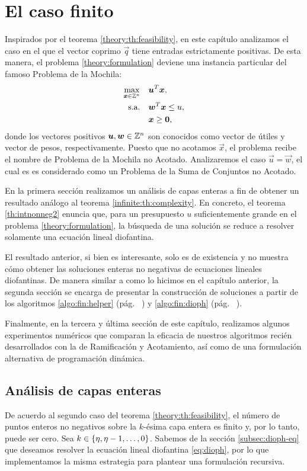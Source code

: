 \chapter{El caso finito}
\noindent
Inspirados por el teorema \ref{theory:th:feasibility}, en este capítulo analizamos el
caso en el que el vector coprimo $\vec{q}$ tiene entradas estrictamente positivas. De esta manera,
el problema \eqref{theory:formulation} deviene una instancia particular del famoso Problema de la
Mochila:
\begin{subequations}
	\label{knapsack-formulation}
	\begin{align}
		\max_{\boldsymbol{x} \in \mathbb{Z}^n} \quad
			& \boldsymbol{u}^T\boldsymbol{x}, \\
		\text{s.a.} \quad
			& \boldsymbol{w}^T\boldsymbol{x} \leq u, \\
			& \boldsymbol{x} \geq \boldsymbol{0},
	\end{align}
\end{subequations}
donde los vectores positivos $\boldsymbol{u}, \boldsymbol{w} \in \mathbb{Z}^n$ son conocidos como
vector de útiles y vector de pesos, respectivamente. Puesto que no acotamos
$\vec{x}$, el problema recibe el nombre de Problema de la Mochila no Acotado.
Analizaremos el caso $\vec{u} = \vec{w}$, el cual es es considerado como un
Problema de la Suma de Conjuntos no Acotado.

En la primera sección realizamos un análisis de capas enteras a fin de obtener
un resultado análogo al teorema \ref{infinite:th:complexity}. En concreto, el
teorema \ref{th:intnonneg2} enuncia que, para un presupuesto $u$
suficientemente grande en el problema \eqref{theory:formulation}, la búsqueda
de una solución se reduce a resolver solamente una ecuación lineal diofantina.

El resultado anterior, si bien es interesante, solo es de existencia y no
muestra cómo obtener las soluciones enteras no negativas de ecuaciones lineales
diofantinas. De manera similar a como lo hicimos en el capítulo anterior, la
segunda sección se encarga de presentar la construcción de soluciones a partir
de los algoritmos \ref{algo:fin:helper} (pág.~ \pageref{algo:fin:helper}) y
\ref{algo:fin:dioph} (pág.~ \pageref{algo:fin:dioph}).

Finalmente, en la tercera y última sección de este capítulo, realizamos algunos experimentos
numéricos que comparan la eficacia de nuestros algoritmos recién desarrollados con la de
Ramificación y Acotamiento, así como de una formulación alternativa de programación dinámica.

\section{Análisis de capas enteras}
\noindent
De acuerdo al segundo caso del teorema \ref{theory:th:feasibility}, el número de puntos enteros no
negativos sobre la $k$-ésima capa entera es finito y, por lo tanto, puede ser cero. Sea $k \in
\lbrace \eta, \eta - 1, \ldots, 0 \rbrace$. Sabemos de la sección \ref{subsec:dioph-eq} que deseamos resolver la
ecuación lineal diofantina \eqref{eq:dioph}, por lo que implementamos la misma estrategia para
plantear una formulación recursiva. 

